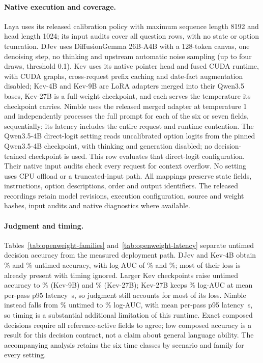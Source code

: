 \paragraph{Native execution and coverage.}
Laya uses its released calibration policy with maximum sequence length 8192 and head length 1024; its input audits cover all \AnswersPerPass{} question rows, with no state or option truncation.
DJev uses DiffusionGemma 26B-A4B with a 128-token canvas, one denoising step, no thinking and upstream automatic noise sampling (up to four draws, threshold 0.1).
Kev uses its native pointer head and fused CUDA runtime, with CUDA graphs, cross-request prefix caching and date-fact augmentation disabled; Kev-4B and Kev-9B are LoRA adapters merged into their Qwen3.5 bases, Kev-27B is a full-weight checkpoint, and each serves the temperature its checkpoint carries.
Nimble uses the released merged adapter at temperature 1 and independently processes the full prompt for each of the six or seven fields, sequentially; its latency includes the entire request and runtime contention.
The Qwen3.5-4B direct-logit setting reads uncalibrated option logits from the pinned Qwen3.5-4B checkpoint, with thinking and generation disabled; no decision-trained checkpoint is used. This row evaluates that direct-logit configuration.
Their native input audits check every request for context overflow. No setting uses CPU offload or a truncated-input path.
All mappings preserve state fields, instructions, option descriptions, order and output identifiers.
The released recordings retain model revisions, execution configuration, source and weight hashes, input audits and native diagnostics where available.

\paragraph{Judgment and timing.}
Tables~\ref{tab:openweight-families} and~\ref{tab:openweight-latency} separate untimed decision accuracy from the measured deployment path.
DJev and Kev-4B obtain \OwDJevUntimed\% and \OwKevUntimed\% untimed accuracy, with log-AUC of \OwDJevAuc\% and \OwKevAuc\%; most of their loss is already present with timing ignored.
Larger Kev checkpoints raise untimed accuracy to \OwKevNineUntimed\% (Kev-9B) and \OwKevTwentySevenUntimed\% (Kev-27B); Kev-27B keeps \OwKevTwentySevenAuc\% log-AUC at mean per-pass p95 latency \OwKevTwentySevenTail\,s, so judgment still accounts for most of its loss.
Nimble instead falls from \OwNimbleUntimed\% untimed to \OwNimbleAuc\% log-AUC, with mean per-pass p95 latency \OwNimbleTail\,s, so timing is a substantial additional limitation of this runtime.
Exact composed decisions require all reference-active fields to agree; low composed accuracy is a result for this decision contract, not a claim about general language ability.
The accompanying analysis retains the six time classes by scenario and family for every setting.

